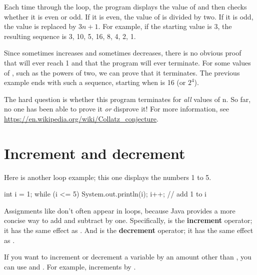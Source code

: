 Each time through the loop, the program displays the value of  and then checks whether it is even or odd.
If it is even, the value of  is divided by two.
If it is odd, the value is replaced by $3n+1$.
For example, if the starting value is 3, the resulting sequence is 3, 10, 5, 16, 8, 4, 2, 1.

Since  sometimes increases and sometimes decreases, there is no obvious proof that  will ever reach 1 and that the program will ever terminate.
For some values of , such as the powers of two, we can prove that it terminates.
The previous example ends with such a sequence, starting when  is 16 (or $2^4$).

The hard question is whether this program terminates for {\em all} values of n.
So far, no one has been able to prove it {\em or} disprove it!
For more information, see \url{https://en.wikipedia.org/wiki/Collatz_conjecture}.


\section{Increment and decrement}

Here is another  loop example; this one displays the numbers 1 to 5.

\begin{code}
int i = 1;
while (i <= 5) {
    System.out.println(i);
    i++;  // add 1 to i
}
\end{code}


Assignments like  don't often appear in loops, because Java provides a more concise way to add and subtract by one.
Specifically, \java{++} is the {\bf increment} operator; it has the same effect as .
And \java{--} is the {\bf decrement} operator; it has the same effect as .


If you want to increment or decrement a variable by an amount other than , you can use \java{+=} and \java{-=}.
For example,  increments  by .

